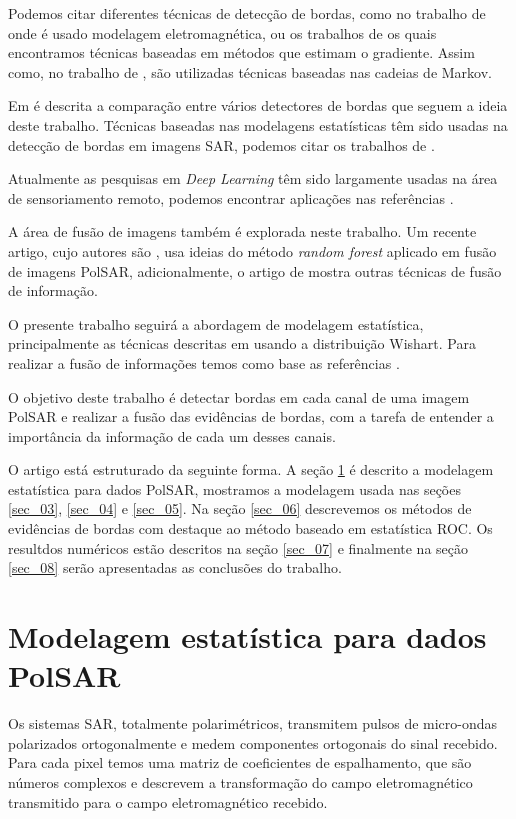 \documentclass[conference]{IEEEtran}
\begin{document}
Podemos citar diferentes técnicas de detecção de bordas, como no trabalho de \cite{slf_2008} onde é usado modelagem eletromagnética, ou os trabalhos de \cite{tlb, obw, flmc, fyf} os quais encontramos técnicas baseadas em métodos que estimam o gradiente. Assim como, no trabalho de \cite{bf}, são utilizadas técnicas baseadas nas cadeias de Markov. 

Em \cite{gfn} é descrita a comparação entre vários detectores de bordas que seguem a ideia deste trabalho. Técnicas baseadas nas modelagens estatísticas têm sido usadas na detecção de bordas em imagens SAR, podemos citar os trabalhos de \cite{gmbf, fbgm, horrit, gfn}. 

Atualmente as pesquisas em \textit{Deep Learning} têm sido largamente usadas na área de sensoriamento remoto, podemos encontrar aplicações nas referências \cite{bac, ztmxzxf, tabmm, xstz}. 

A área de fusão de imagens também é explorada neste trabalho. 
Um recente artigo, cujo autores são \cite{sglmla}, usa ideias do método \textit{random forest} aplicado em fusão de imagens PolSAR, adicionalmente, o artigo de \cite{sg} mostra outras técnicas de fusão de informação.  

O presente trabalho seguirá a abordagem de modelagem estatística, principalmente as técnicas descritas em \cite{fbgm, nhfc} usando a distribuição Wishart. Para realizar a fusão de informações temos como base as referências \cite{mit, sg}. 

O objetivo deste trabalho é detectar bordas em cada canal de uma imagem PolSAR e realizar a fusão das evidências de bordas, com a tarefa de entender a importância da informação de cada um desses canais. 

O artigo está estruturado da seguinte forma. A seção \ref{sec_02} é descrito a modelagem estatística para dados PolSAR, mostramos a modelagem usada nas seções \ref{sec_03}, \ref{sec_04} e \ref{sec_05}. Na seção \ref{sec_06} descrevemos os métodos de evidências de bordas com destaque ao método baseado em estatística ROC. Os resultdos numéricos estão descritos na seção \ref{sec_07} e finalmente na seção \ref{sec_08} serão apresentadas as conclusões do trabalho. 
\section{Modelagem estatística para dados PolSAR}\label{sec_02}
Os sistemas SAR, totalmente polarimétricos, transmitem pulsos de micro-ondas polarizados ortogonalmente e medem componentes ortogonais do sinal recebido. Para cada pixel temos uma matriz de coeficientes de espalhamento, que são números complexos e descrevem a transformação do campo eletromagnético transmitido para o campo eletromagnético recebido.
\end{document}
